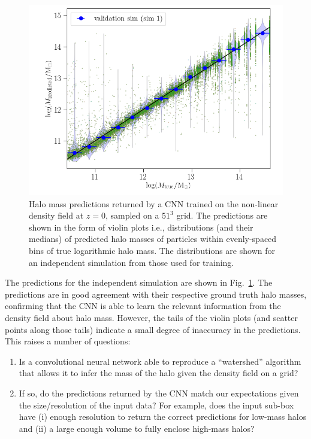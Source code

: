 \documentclass[11pt]{article}
\begin{document}
\begin{figure}[t]
\centering
\includegraphics[width=0.85\columnwidth]{z0/predictions_reseed1.png}
\caption{Halo mass predictions returned by a CNN trained on the non-linear density field at $z=0$, sampled on a $51^3$ grid. The predictions are shown in the form of violin plots i.e., distributions (and their medians) of predicted halo masses of particles within evenly-spaced bins of true logarithmic halo mass. The distributions are shown for an independent simulation from those used for training.}
\label{z0_predictions}
\end{figure}

The predictions for the independent simulation are shown in Fig.~\ref{z0_predictions}. The predictions are in good agreement with their respective ground truth halo masses, confirming that the CNN is able to learn the relevant information from the density field about halo mass. However, the tails of the violin plots (and scatter points along those tails) indicate a small degree of inaccuracy in the predictions. This raises a number of questions:
\begin{enumerate}
	\item Is a convolutional neural network able to reproduce a ``watershed'' algorithm that allows it to infer the mass of the halo given the density field on a grid? 
	\item If so, do the predictions returned by the CNN match our expectations given the size/resolution of the input data? For example, does the input sub-box have (i) enough resolution to return the correct predictions for low-mass halos and (ii) a large enough volume to fully enclose high-mass halos?
\end{enumerate}
\end{document}
